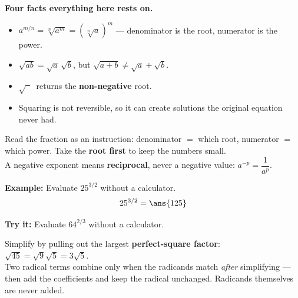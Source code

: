 \documentclass[12pt]{article}
\begin{document}

\begin{formulabox}
\textbf{Four facts everything here rests on.}
\begin{itemize}[leftmargin=0.9cm, itemsep=1pt, topsep=1pt]
\item $a^{m/n} = \sqrt[n]{a^m} = \left(\sqrt[n]{a}\right)^m$ --- denominator is
the root, numerator is the power.
\item $\sqrt{ab} = \sqrt{a}\,\sqrt{b}$, but $\sqrt{a+b} \neq \sqrt{a}+\sqrt{b}$.
\item $\sqrt{\phantom{x}}\,$ returns the \textbf{non-negative} root.
\item Squaring is not reversible, so it can create solutions the original
equation never had.
\end{itemize}
\end{formulabox}


\begin{formulabox}
Read the fraction as an instruction: denominator $=$ which root, numerator $=$
which power. Take the \textbf{root first} to keep the numbers small.\\[2pt]
A negative exponent means \textbf{reciprocal}, never a negative value:
$a^{-p} = \dfrac{1}{a^{p}}$.
\end{formulabox}

\begin{examplebox}
\textbf{Example:} Evaluate $25^{3/2}$ without a calculator.
\[ 25^{3/2} = \ans{125} \]
\end{examplebox}

\begin{tryitbox}
\textbf{Try it:} Evaluate $64^{2/3}$ without a calculator.\\[2pt]
\end{tryitbox}


\begin{formulabox}
Simplify by pulling out the largest \textbf{perfect-square factor}:
$\sqrt{45} = \sqrt{9}\sqrt{5} = 3\sqrt{5}$.\\[2pt]
Two radical terms combine only when the radicands match \emph{after} simplifying
--- then add the coefficients and keep the radical unchanged. Radicands
themselves are never added.
\end{formulabox}
\end{document}
